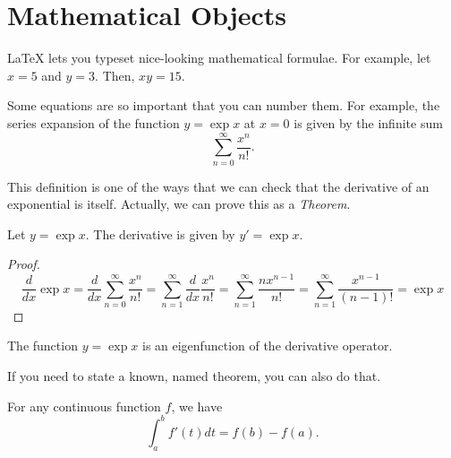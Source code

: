 \documentclass[12pt,reqno,twoside]{amsbook}
\begin{document}
\section{Mathematical Objects}

LaTeX lets you typeset nice-looking mathematical formulae. For example, let $x = 5$ and $y = 3$. Then, $xy = 15$.

Some equations are so important that you can number them. For example, the series expansion of the function $y = \exp{x}$ at $x=0$ is given by the infinite sum
\begin{equation}
    \sum_{n=0}^{\infty} \frac{x^n}{n!}.
\end{equation}

This definition is one of the ways that we can check that the derivative of an exponential is itself. Actually, we can prove this as a \textit{Theorem}.

\begin{theorem}
    Let $y = \exp{x}$. The derivative is given by $y' = \exp{x}$.
\end{theorem}

\begin{proof}
\[
\frac{d}{dx} \exp{x} = \frac{d}{dx} \sum_{n=0}^{\infty} \frac{x^n}{n!} = \sum_{n=1}^{\infty} \frac{d}{dx} \frac{x^n}{n!} = \sum_{n=1}^{\infty}  \frac{n x^{n-1}}{n!} = \sum_{n=1}^{\infty}  \frac{x^{n-1}}{(n-1)!} = \exp{x}
\]
\end{proof}

\begin{corollary}
    The function $y=\exp{x}$ is an eigenfunction of the derivative operator.
\end{corollary}

\noindent If you need to state a known, named theorem, you can also do that.

\begin{theorem}
For any continuous function $f$, we have
    \[
    \int_{a}^{b} f'(t) dt = f(b) - f(a).
    \]
\end{theorem}
\end{document}
